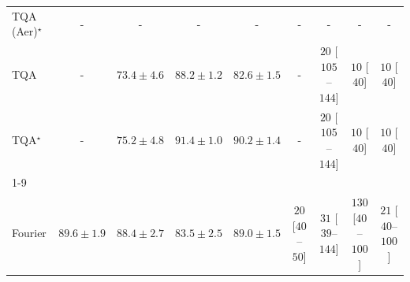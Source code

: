 \begin{tabular}{l|cccc|cccc|}
TQA (Aer)$^\star$ & {\cellcolor[HTML]{000000}} \color[HTML]{F1F1F1} {\cellcolor{white}} \color{black} - & {\cellcolor[HTML]{000000}} \color[HTML]{F1F1F1} {\cellcolor{white}} \color{black} - & {\cellcolor[HTML]{000000}} \color[HTML]{F1F1F1} {\cellcolor{white}} \color{black} - & {\cellcolor[HTML]{000000}} \color[HTML]{F1F1F1} {\cellcolor{white}} \color{black} - & {\cellcolor[HTML]{000000}} \color[HTML]{F1F1F1} {\cellcolor{white}} \color{black} - & {\cellcolor[HTML]{000000}} \color[HTML]{F1F1F1} {\cellcolor{white}} \color{black} - & {\cellcolor[HTML]{000000}} \color[HTML]{F1F1F1} {\cellcolor{white}} \color{black} - & {\cellcolor[HTML]{000000}} \color[HTML]{F1F1F1} {\cellcolor{white}} \color{black} - \\
TQA & {\cellcolor[HTML]{000000}} \color[HTML]{F1F1F1} {\cellcolor{white}} \color{black} - & {\cellcolor[HTML]{FEDA7E}} \color[HTML]{000000} $73.4\pm 4.6$ & {\cellcolor[HTML]{C44802}} \color[HTML]{F1F1F1} $88.2\pm 1.2$ & {\cellcolor[HTML]{F27D1B}} \color[HTML]{F1F1F1} $82.6\pm 1.5$ & {\cellcolor[HTML]{000000}} \color[HTML]{F1F1F1} {\cellcolor{white}} \color{black} - & {\cellcolor[HTML]{FFF3EF}} \color[HTML]{000000} $20$ [$105$--$144$] & {\cellcolor[HTML]{FFF5F1}} \color[HTML]{000000} $10$ [$40$] & {\cellcolor[HTML]{FFF5F1}} \color[HTML]{000000} $10$ [$40$] \\
TQA$^\star$ & {\cellcolor[HTML]{000000}} \color[HTML]{F1F1F1} {\cellcolor{white}} \color{black} - & {\cellcolor[HTML]{FECB5F}} \color[HTML]{000000} $75.2\pm 4.8$ & {\cellcolor[HTML]{9B3504}} \color[HTML]{F1F1F1} $91.4\pm 1.0$ & {\cellcolor[HTML]{AB3C03}} \color[HTML]{F1F1F1} $90.2\pm 1.4$ & {\cellcolor[HTML]{000000}} \color[HTML]{F1F1F1} {\cellcolor{white}} \color{black} - & {\cellcolor[HTML]{FFF3EF}} \color[HTML]{000000} $20$ [$105$--$144$] & {\cellcolor[HTML]{FFF5F1}} \color[HTML]{000000} $10$ [$40$] & {\cellcolor[HTML]{FFF5F1}} \color[HTML]{000000} $10$ [$40$] \\
\cline{1-9}
\multicolumn{9}{c}{\rule{0pt}{8pt}PP} \\
\midrule
Fourier & {\cellcolor[HTML]{12763D}} \color[HTML]{F1F1F1} $89.6\pm 1.9$ & {\cellcolor[HTML]{1C7E40}} \color[HTML]{F1F1F1} $88.4\pm 2.7$ & {\cellcolor[HTML]{45AD5F}} \color[HTML]{F1F1F1} $83.5\pm 2.5$ & {\cellcolor[HTML]{177B3F}} \color[HTML]{F1F1F1} $89.0\pm 1.5$ & {\cellcolor[HTML]{FFF3EF}} \color[HTML]{000000} $20$ [$40$--$50$] & {\cellcolor[HTML]{FEEFEB}} \color[HTML]{000000} $31$ [$39$--$144$] & {\cellcolor[HTML]{FDD3CF}} \color[HTML]{000000} $130$ [$40$--$100$] & {\cellcolor[HTML]{FFF2EE}} \color[HTML]{000000} $21$ [$40$--$100$] \\

\end{tabular}
